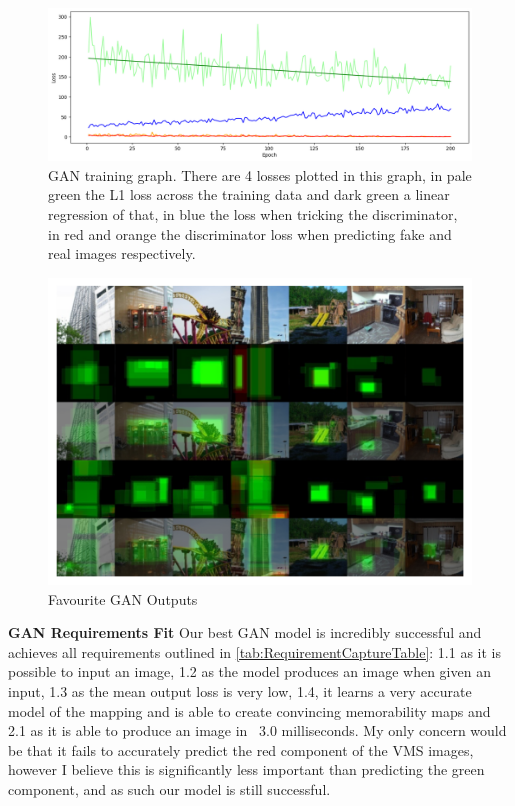 \documentclass{UoYCSproject}
\begin{document}
\begin{figure}[ht]
    \centering
    \includegraphics[width=\linewidth]{GAN Training Curve}
    \caption{GAN training graph. There are 4 losses plotted in this graph, in pale green the L1 loss across the training data and dark green a linear regression of that, in blue the loss when tricking the discriminator, in red and orange the discriminator loss when predicting fake and real images respectively.}
    \label{fig:GANTraining}
\end{figure}

\begin{figure}[ht]
    \centering
    \includegraphics[width=\linewidth]{Good GAN Outputs}
    \caption{Favourite GAN Outputs}
    \label{fig:GANGoodOutput}
\end{figure}

\textbf{GAN Requirements Fit}
Our best GAN model is incredibly successful and achieves all requirements outlined in \ref{tab:RequirementCaptureTable}: 1.1 as it is possible to input an image, 1.2 as the model produces an image when given an input, 1.3 as the mean output loss is very low, 1.4, it learns a very accurate model of the mapping and is able to create convincing memorability maps and 2.1 as it is able to produce an image in ~3.0 milliseconds. My only concern would be that it fails to accurately predict the red component of the VMS images, however I believe this is significantly less important than predicting the green component, and as such our model is still successful.
\end{document}

